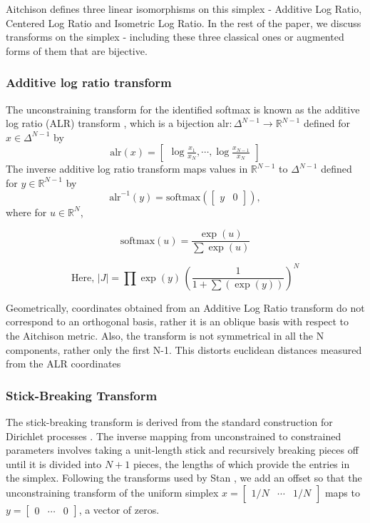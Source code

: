 \documentclass[11pt]{article}
\newcommand{\abs}[1]{\left| #1 \right|}
\begin{document}
Aitchison defines three linear isomorphisms on this simplex - Additive Log Ratio, Centered Log Ratio and Isometric Log Ratio. In the rest of the paper, we discuss transforms on the simplex - including these three classical ones or augmented forms of them that are bijective.


\subsubsection{Additive log ratio transform}
The unconstraining transform for the identified softmax is known as
the additive log ratio (ALR) transform
\cite{aitchison1982statistical}, which is a bijection
$\textrm{alr}:\Delta^{N-1} \rightarrow \mathbb{R}^{N-1}$ defined for
$x \in \Delta^{N-1}$ by
\[
  \textrm{alr}(x)
  = \begin{bmatrix}\displaystyle
    \log \frac{x_1}{x_N}, \cdots , \log \frac{x_{N-1}}{x_N}
  \end{bmatrix}
\]
The inverse additive log ratio transform maps values in
$\mathbb{R}^{N-1}$ to $\Delta^{N-1}$ defined for $y \in
\mathbb{R}^{N-1}$ by
\[
  \textrm{alr}^{-1}(y)
  = \textrm{softmax}(\begin{bmatrix} y &  0 \end{bmatrix}),
\]
where for $u \in \mathbb{R}^N$,

\[
  \textrm{softmax}(u) = \frac{\exp(u)}{\sum \exp(u)}
\]

\[
\textrm{Here, } \abs{J} = \prod \exp(y)
  \, \left( \frac{1}{1 + \sum(\exp(y))} \right)^N
\]

Geometrically, coordinates obtained from an Additive Log Ratio transform do not correspond to an orthogonal basis, rather it is an oblique basis with respect to the Aitchison metric. Also, the transform is not symmetrical in all the N components, rather only the first N-1. This distorts euclidean distances measured from the ALR coordinates
\subsubsection{Stick-Breaking Transform}

The stick-breaking transform is derived from the standard construction for Dirichlet processes \cite{sethuraman1994constructive}. The inverse mapping from unconstrained to constrained parameters involves taking a unit-length stick and recursively breaking pieces off until it is divided into $N + 1$ pieces, the lengths of which provide the entries in the simplex.  Following the transforms used by Stan \cite{stan2022ref}, we add an offset so that the unconstraining transform of the uniform simplex $x = \begin{bmatrix} 1/N & \cdots & 1/N \end{bmatrix}$ maps to $y = \begin{bmatrix} 0 & \cdots & 0 \end{bmatrix}$, a vector of zeros.
\end{document}
